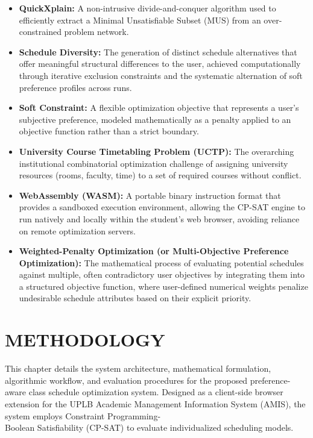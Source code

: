 \documentclass{icsthesis}
\begin{document}
\begin{mainmatter}
\begin{itemize}
			\item \textbf{QuickXplain:} A non-intrusive divide-and-conquer algorithm used to efficiently extract a Minimal Unsatisfiable Subset (MUS) from an over-constrained problem network.
			
			\item \textbf{Schedule Diversity:} The generation of distinct schedule alternatives that offer meaningful structural differences to the user, achieved computationally through iterative exclusion constraints and the systematic alternation of soft preference profiles across runs.
			
			\item \textbf{Soft Constraint:} A flexible optimization objective that represents a user's subjective preference, modeled mathematically as a penalty applied to an objective function rather than a strict boundary.
			
			\item \textbf{University Course Timetabling Problem (UCTP):} The overarching institutional combinatorial optimization challenge of assigning university resources (rooms, faculty, time) to a set of required courses without conflict.
			
			\item \textbf{WebAssembly (WASM):} A portable binary instruction format that provides a sandboxed execution environment, allowing the CP-SAT engine to run natively and locally within the student's web browser, avoiding reliance on remote optimization servers.
			
			\item \textbf{Weighted-Penalty Optimization (or Multi-Objective Preference Optimization):} The mathematical process of evaluating potential schedules against multiple, often contradictory user objectives by integrating them into a structured objective function, where user-defined numerical weights penalize undesirable schedule attributes based on their explicit priority.
		\end{itemize}
		
		
		\section{METHODOLOGY}
		
		This chapter details the system architecture, mathematical formulation, algorithmic workflow, and evaluation procedures for the proposed preference-aware class schedule optimization system. Designed as a client-side browser extension for the UPLB Academic Management Information System (AMIS), the system employs Constraint Programming-\\Boolean Satisfiability (CP-SAT) to evaluate individualized scheduling models.
		

\end{mainmatter}
\end{document}
